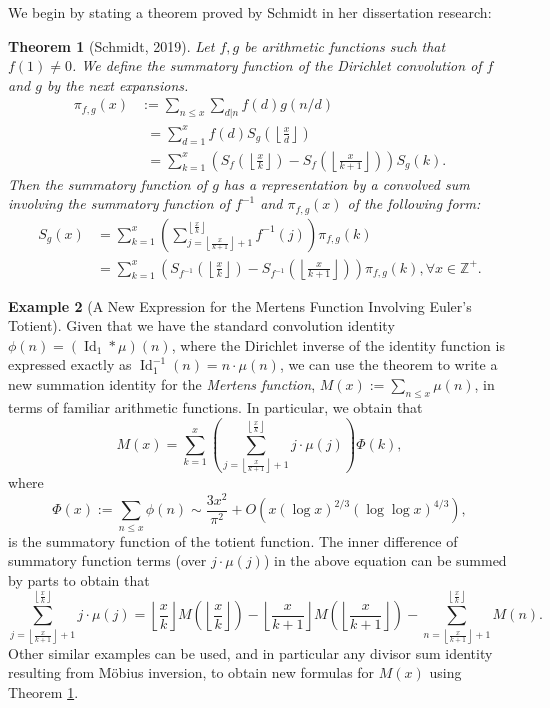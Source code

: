 \documentclass[11pt,reqno]{amsart}
\numberwithin{figure}{section}
\numberwithin{table}{section}
\newcommand{\floor}[1]{\left\lfloor #1 \right\rfloor}
\theoremstyle{plain}
\newtheorem{theorem}{Theorem}
\numberwithin{theorem}{section}
\theoremstyle{definition}
\newtheorem{example}[theorem]{Example}
\begin{document}
We begin by stating a theorem proved by Schmidt in her dissertation research: 

\begin{theorem}[Schmidt, 2019] 
\label{theorem_Schmidt2019} 
Let $f,g$ be arithmetic functions such that $f(1) \neq 0$. We define the summatory 
function of the Dirichlet convolution of $f$ and $g$ by the next expansions. 
\begin{align*} 
\pi_{f,g}(x) & := \sum_{n \leq x} \sum_{d|n} f(d) g(n/d) \\ 
     & \phantom{:} = \sum_{d=1}^{x} f(d) S_g\left(\floor{\frac{x}{d}}\right) \\ 
     & \phantom{:} = \sum_{k=1}^{x} \left(S_f\left(\floor{\frac{x}{k}}\right) - 
     S_f\left(\floor{\frac{x}{k+1}}\right)\right) S_g(k). 
\end{align*} 
Then the summatory function of $g$ has a representation by a convolved sum involving 
the summatory function of $f^{-1}$ and $\pi_{f,g}(x)$ of the following form: 
\begin{align*} 
S_g(x) & = \sum_{k=1}^{x} \left(\sum_{j=\floor{\frac{x}{k+1}}+1}^{\floor{\frac{x}{k}}} f^{-1}(j)\right) 
     \pi_{f,g}(k) \\ 
     & = \sum_{k=1}^{x} \left(S_{f^{-1}}\left(\floor{\frac{x}{k}}\right) - 
     S_{f^{-1}}\left(\floor{\frac{x}{k+1}}\right)\right) \pi_{f,g}(k), 
     \forall x \in \mathbb{Z}^{+}. 
\end{align*} 
\end{theorem} 

\begin{example}[A New Expression for the Mertens Function Involving Euler's Totient] 
\label{example_Mx_ExOfThm} 
Given that we have the standard convolution identity $\phi(n) = (\operatorname{Id}_1 \ast \mu)(n)$, 
where the Dirichlet inverse of the identity function is expressed exactly as 
$\operatorname{Id}_1^{-1}(n) = n \cdot \mu(n)$, we can use the theorem to write a new 
summation identity for the \emph{Mertens function}, $M(x) := \sum_{n \leq x} \mu(n)$, in terms of 
familiar arithmetic functions. 
In particular, we obtain that 
\[
M(x) = \sum_{k=1}^{x} \left(\sum_{j=\floor{\frac{x}{k+1}}+1}^{\floor{\frac{x}{k}}} j \cdot \mu(j)\right) 
     \Phi(k),
\]
where 
$$\Phi(x) := \sum_{n \leq x} \phi(n) \sim \frac{3x^2}{\pi^2} + O\left(x (\log x)^{2/3} (\log\log x)^{4/3}\right),$$ 
is the summatory function of the totient function. 
The inner difference of summatory function terms (over $j \cdot \mu(j)$) in the above equation 
can be summed by parts to obtain that 
\[
\sum_{j=\floor{\frac{x}{k+1}}+1}^{\floor{\frac{x}{k}}} j \cdot \mu(j) = 
     \floor{\frac{x}{k}} M\left(\floor{\frac{x}{k}}\right) - 
     \floor{\frac{x}{k+1}} M\left(\floor{\frac{x}{k+1}}\right) - 
     \sum_{n=\floor{\frac{x}{k+1}}+1}^{\floor{\frac{x}{k}}} M(n). 
\]
Other similar examples can be used, and in particular any divisor sum identity resulting from 
M\"obius inversion, to obtain new formulas for $M(x)$ using 
Theorem \ref{theorem_Schmidt2019}. 
\end{example} 
\end{document}
